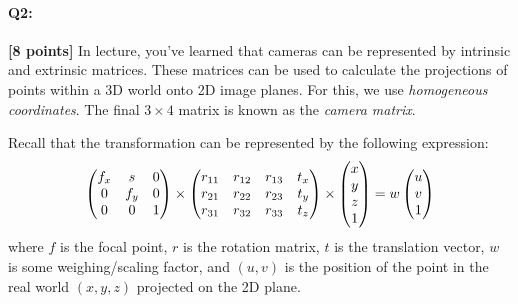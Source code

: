\paragraph{Q2:} \textbf{[8 points]}
In lecture, you've learned that cameras can be represented by intrinsic and extrinsic matrices. These matrices can be used to calculate the projections of points within a 3D world onto 2D image planes. For this, we use \emph{homogeneous coordinates}. The final $3\times4$ matrix is known as the \emph{camera matrix}.

Recall that the transformation can be represented by the following expression:
\begin{align*}
    \begin{pmatrix} 
    f_x & s & $0$ \\ 
    $0$ & f_y & $0$ \\ 
    $0$ & $0$ & $1$ \end{pmatrix} \times
    \begin{pmatrix} 
    r_{11} & r_{12} & r_{13} & t_x \\ 
    r_{21} & r_{22} & r_{23} & t_y \\  
    r_{31} & r_{32} & r_{33} & t_z
    \end{pmatrix} \times 
    \begin{pmatrix} 
    x \\ 
    y \\ 
    z \\ 
    $1$ \end{pmatrix}
    = w
    \begin{pmatrix}  u \\ v \\ $1$ \end{pmatrix}
\end{align*}
where $f$ is the focal point, $r$ is the rotation matrix, $t$ is the translation vector,  $w$ is some weighing/scaling factor, and $(u, v)$ is the position of the point in the real world $(x, y, z)$ projected on the 2D plane.

